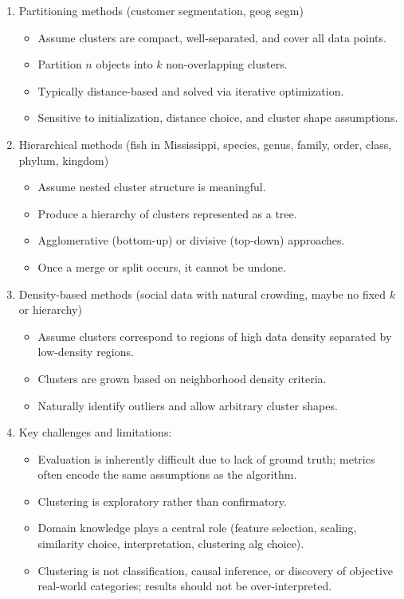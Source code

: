 \documentclass{article}
\begin{document}
\begin{enumerate}
\begin{enumerate}
\item Partitioning methods (customer segmentation, geog segm)
\begin{itemize}
\item Assume clusters are compact, well-separated, and cover all data points.
\item Partition $n$ objects into $k$ non-overlapping clusters.
\item Typically distance-based and solved via iterative optimization.
\item Sensitive to initialization, distance choice, and cluster shape assumptions.
\end{itemize}

\item Hierarchical methods (fish in Mississippi, species, genus, family, order, class, phylum, kingdom)
\begin{itemize}
\item Assume nested cluster structure is meaningful.
\item Produce a hierarchy of clusters represented as a tree.
\item Agglomerative (bottom-up) or divisive (top-down) approaches.
\item Once a merge or split occurs, it cannot be undone.
\end{itemize}

\item Density-based methods (social data with natural crowding, maybe no fixed $k$ or hierarchy)
\begin{itemize}
\item Assume clusters correspond to regions of high data density separated by low-density regions.
\item Clusters are grown based on neighborhood density criteria.
\item Naturally identify outliers and allow arbitrary cluster shapes.
\end{itemize}

\item Key challenges and limitations:
\begin{itemize}
\item Evaluation is inherently difficult due to lack of ground truth; metrics often encode the same assumptions as the algorithm.
\item Clustering is exploratory rather than confirmatory.
\item Domain knowledge plays a central role (feature selection, scaling, similarity choice, interpretation, clustering alg choice).
\item Clustering is not classification, causal inference, or discovery of objective real-world categories; results should not be over-interpreted.
\end{itemize}

\end{enumerate}
\end{enumerate}
\end{document}

